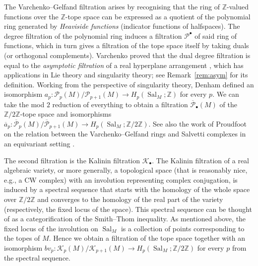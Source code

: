 \documentclass{amsart}
\newcommand\Kcal{{\mathcal K}}
\newcommand\Pcal{{\mathcal P}}
\newcommand\ZZ{{\mathbb Z}}
\newcommand\Ztwo{{\mathbb Z}/2{\mathbb Z}}
\newcommand\abv{{a}}
\DeclareMathOperator{\Sal}{Sal}
\begin{document}
The Varchenko--Gelfand filtration arises by recognising that the ring of $\ZZ$-valued functions over the $\ZZ$-tope space can be expressed as a quotient of the polynomial ring generated by {\em Heaviside functions} (indicator functions of halfspaces). The degree filtration of the polynomial ring induces a filtration $\Pcal^\bullet$ of said ring of functions, which in turn gives a filtration of the tope space itself by taking duals (or orthogonal complements).
Varchenko proved that the dual degree filtration is equal to the {\em asymptotic filtration} of a real hyperplane arrangement \cite{Var93}, which has applications in Lie theory and singularity theory; see Remark~\ref{rem:asym} for its definition.
Working from the perspective of singularity theory, Denham \cite{Denham_OS} defined an isomorphism $\abv_p: \Pcal_p(M)/ \Pcal_{p+1}(M) \to H_p(\Sal_M; \ZZ)$ for every $p$.
We can take the mod $2$ reduction of everything to obtain a filtration $\overline{\Pcal}_\bullet(M)$ of the $\Ztwo$-tope space and isomorphisms $\overline{\abv}_p :
\overline{\Pcal}_p(M) / \overline{\Pcal}_{p+1}(M) \to H_p(\Sal_M; \Ztwo)$. See also the work of Proudfoot on the relation between the Varchenko--Gelfand rings and Salvetti complexes in an equivariant setting \cite{Pro06}.

The second filtration is the Kalinin filtration $\Kcal_\bullet$. 
The Kalinin filtration of a real algebraic variety, or more generally, a topological space (that is reasonably nice, e.g., a CW complex) with an involution representing complex conjugation, is induced by a spectral sequence that starts with the homology of the whole space over $\Ztwo$ and converges to the homology of the real part of the variety (respectively, the fixed locus of the space).
This spectral sequence can be thought of as a categorification of the Smith--Thom inequality.
As mentioned above, the fixed locus of the involution on $\Sal_M$ is a collection of points corresponding to the topes of $M$. Hence we obtain a filtration of the tope space together with an isomorphism $bv_p : \Kcal_p(M)/\Kcal_{p+1}(M) \to H_p(\Sal_M;\ZZ/2\ZZ)$ for every $p$ from the spectral sequence.
\end{document}
